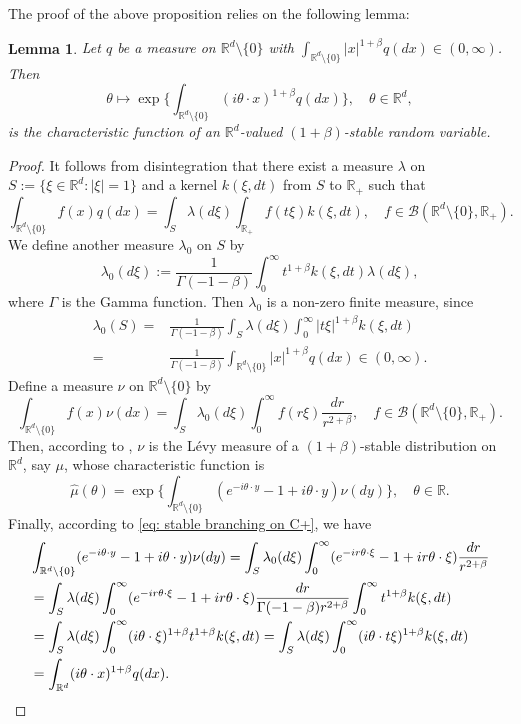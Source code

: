 \documentclass[12pt,a4paper]{amsart}
\theoremstyle{plain}
\newtheorem{lem}[thm]{Lemma}
\theoremstyle{definition}
\numberwithin{equation}{section}
\begin{document}
The proof of the above proposition relies on the following lemma:
\begin{lem}
  \label{lem: charactreisticfunction}
  Let $q$ be a measure on $\mathbb R^d\setminus\{0\}$ with
  $\int_{\mathbb R^d\setminus\{0\}} |x|^{1+\beta} q(dx) \in (0,\infty)$.
  Then
  \[
    \theta
    \mapsto  \exp\Big\{\int_{\mathbb R^d\setminus\{0\}} (i\theta \cdot x)^{1+\beta} q(dx)\Big\},
    \quad \theta \in \mathbb R^d,
  \]
  is the characteristic function of an $\mathbb R^d$-valued $(1+\beta)$-stable random variable.
\end{lem}
\begin{proof}
  It follows from disintegration that there exist a measure $\lambda$ on $S:= \{\xi\in \mathbb R^d:|\xi| = 1\}$ and a kernel $k(\xi,dt)$ from $S$ to $\mathbb R_+$ such that
  \[
    \int_{\mathbb R^d\setminus \{0\}} f(x)q(dx)
    = \int_S \lambda(d\xi) \int_{\mathbb R_+} f(t \xi)k(\xi,dt)
    , \quad f\in \mathcal B(\mathbb R^d\setminus \{0\}, \mathbb R_+).
  \]
  We define another measure $\lambda_0$ on $S$ by
  \[
    \lambda_0(d\xi)
    := \frac1{\Gamma(-1-\beta)}\int_0^\infty t^{1+\beta}k(\xi,dt) \lambda (d\xi),
  \]
  where $\Gamma$ is the Gamma function.
  Then $\lambda_0$ is a non-zero finite measure, since
  \begin{align}
    \lambda_0(S)
      = &\frac{1}{\Gamma(-1-\beta)} \int_S \lambda (d\xi) \int_0^\infty |t\xi|^{1+\beta}k(\xi,dt) \\
   =  & \frac{1}{\Gamma(-1-\beta)} \int_{\mathbb R^d\setminus\{0\}} |x|^{1+\beta} q(dx) \in (0,\infty).
  \end{align}
  Define a measure $\nu$ on $\mathbb R^d\setminus\{0\}$ by
  \[
    \int_{\mathbb R^d\setminus\{0\}}f(x)\nu(dx)
    = \int_{S} \lambda_0(d\xi) \int_0^\infty f(r\xi) \frac{dr}{r^{2+\beta}}
    ,\quad f\in \mathcal B(\mathbb R^d\setminus \{0\}, \mathbb R_+).
  \]
  Then, according to \cite[Remark 14.4]{Sato2013Levy}, $\nu$ is the L\'evy measure of a $(1+\beta)$-stable distribution on $\mathbb R^d$, say $\mu$, whose characteristic function is
  \[
    \hat \mu(\theta)
    = \exp \Big \{ \int_{\mathbb R^d\setminus\{0\}} (e^{-i\theta \cdot y}-1+i\theta \cdot y) \nu(dy) \Big \}
    , \quad \theta \in \mathbb R.
  \]
  Finally, according to \eqref{eq: stable branching on C+}, we have
  \begin{align}
    & \int_{\mathbb R^d\setminus\{0\}} (e^{-i\theta \cdot y}-1+i\theta \cdot y) \nu(dy)
      = \int_S \lambda_0(d\xi) \int_0^\infty (e^{-ir\theta \cdot \xi}-1+ir\theta \cdot \xi) \frac{dr}{r^{2+\beta}} \\
    & = \int_S \lambda (d\xi) \int_0^\infty (e^{-ir\theta \cdot \xi}-1+ir\theta \cdot \xi) \frac{dr}{\Gamma(-1-\beta)r^{2+\beta}}\int_0^\infty t^{1+\beta} k(\xi,dt) \\
    & = \int_S \lambda (d\xi) \int_0^\infty (i\theta\cdot \xi)^{1+\beta} t^{1+\beta} k(\xi,dt)
      = \int_S \lambda(d\xi) \int_0^\infty (i\theta \cdot t\xi)^{1+\beta} k(\xi,dt) \\
    & = \int_{\mathbb R^d} (i\theta \cdot x)^{1+\beta} q(dx).
      \qedhere
  \end{align}
\end{proof}
\end{document}
